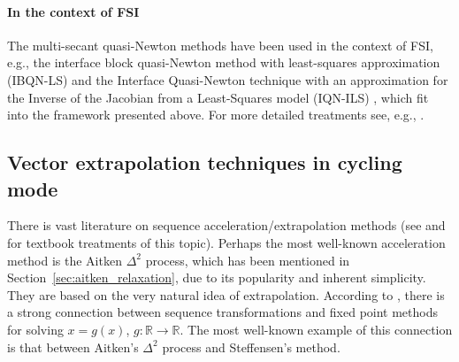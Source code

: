           \paragraph{In the context of FSI}

          The multi-secant quasi-Newton methods have been used in the context of FSI, e.g., the interface block quasi-Newton method with least-squares approximation (IBQN-LS) \citep{vierendeels_implicit_2007} and the Interface Quasi-Newton technique with an approximation for the Inverse of the Jacobian from a Least-Squares model (IQN-ILS) \citep{degroote2009performance}, which fit into the framework presented above.
          For more detailed treatments see, e.g., \cite{haelterman_quasi-newton_2009, gatzhammer_efficient_2014, uekermann_partitioned_2016, scheufele_coupling_2018}.

          \subsection{Vector extrapolation techniques in cycling mode} \label{sec:vector_extrapolation}

          There is vast literature on sequence acceleration/extrapolation methods (see  \cite{brezinski_extrapolation_2013} and \cite{sidi_vector_2017} for textbook treatments of this topic).
          Perhaps the most well-known acceleration method is the Aitken \(\Delta^2\) process, which has been mentioned in Section~\ref{sec:aitken_relaxation}, due to its popularity and inherent simplicity.
          They are based on the very natural idea of extrapolation.
          According to \cite{brezinski_extrapolation_2013}, there is a strong connection between sequence transformations and fixed point methods for solving \(x= g( x)\), \(g\colon \mathbb R\to \mathbb R\).
          The most well-known example of this connection is that between Aitken's \(\Delta^{2}\) process and Steffensen's method.

